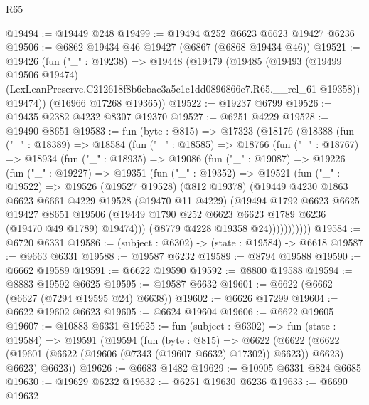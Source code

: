 \begin{lexlean}{R65}
\begin{coremodule}
{@19494 := @19449 @248
@19499 := @19494 @252 @6623 @6623 @19427 @6236
@19506 := @6862 @19434 @46 @19427 (@6867 (@6868 @19434 @46))
@19521 := @19426
    (fun ("_" : @19238) =>
    @19448
      (@19479
        (@19485
          (@19493
            (@19499 @19506 @19474)
            (LexLeanPreserve.C212618f8b6ebac3a5c1e1dd0896866e7.R65.__rel_61 @19358))
          @19474))
      (@16966 @17268 @19365))
@19522 := @19237 @6799
@19526 := @19435 @2382 @4232 @8307 @19370
@19527 := @6251 @4229
@19528 := @19490 @8651
@19583 := fun (byte : @815) =>
  @17323
    (@18176
      (@18388
        (fun ("_" : @18389) =>
        @18584
          (fun ("_" : @18585) =>
          @18766
            (fun ("_" : @18767) =>
            @18934
              (fun ("_" : @18935) =>
              @19086
                (fun ("_" : @19087) =>
                @19226
                  (fun ("_" : @19227) =>
                  @19351
                    (fun ("_" : @19352) =>
                    @19521
                      (fun ("_" : @19522) =>
                      @19526
                        (@19527 @19528)
                        (@812 @19378)
                        (@19449
                          @4230
                          @1863
                          @6623
                          @6661
                          @4229
                          @19528
                          (@19470 @11 @4229)
                          (@19494
                            @1792
                            @6623
                            @6625
                            @19427
                            @8651
                            @19506
                            (@19449 @1790 @252 @6623 @6623 @1789 @6236 (@19470 @49 @1789) @19474)))
                        (@8779 @4228 @19358 @24)))))))))))
@19584 := @6720 @6331
@19586 := (subject : @6302) -> (state : @19584) -> @6618
@19587 := @9663 @6331
@19588 := @19587 @6232
@19589 := @8794 @19588
@19590 := @6662 @19589
@19591 := @6622 @19590
@19592 := @8800 @19588
@19594 := @8883 @19592 @6625
@19595 := @19587 @6632
@19601 := @6622 (@6662 (@6627 (@7294 @19595 @24) @6638))
@19602 := @6626 @17299
@19604 := @6622 @19602 @6623
@19605 := @6624 @19604
@19606 := @6622 @19605
@19607 := @10883 @6331
@19625 := fun (subject : @6302) =>
  fun (state : @19584) =>
  @19591
    (@19594
      (fun (byte : @815) =>
      @6622
        (@6622 (@6622 (@19601 (@6622 (@19606 (@7343 (@19607 @6632) @17302)) @6623)) @6623) @6623)
        @6623))
@19626 := @6683 @1482
@19629 := @10905 @6331 @824 @6685
@19630 := @19629 @6232
@19632 := @6251 @19630 @6236
@19633 := @6690 @19632
}
\end{coremodule}
\end{lexlean}
